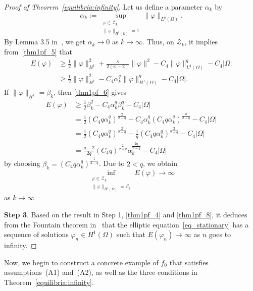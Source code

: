 \documentclass{elsarticle}
\begin{document}
\begin{proof}[Proof of Theorem~\ref{equilibria:infinity}]
Let us define a parameter $\alpha_k$ by
\[	
	\alpha_k:=\sup_{\substack{\varphi\in \mathcal{Z}_k \\ \|\varphi\|_{H^1(\Omega)}=1}}\|\varphi\|_{L^{q}(\Omega)}.
\]
By Lemma 3.5 in~\cite{Zhao2008}, we get $\alpha_k\rightarrow 0$ as $k\rightarrow\infty$. Thus, on $\mathcal{Z}_k$, it implies from~\eqref{thm1pf_5} that
\begin{equation}\label{thm1pf_6}
\begin{split}
	E(\varphi) &\geqslant \frac{1}{2} \|\varphi\|^2_{H^1} + \frac{\kappa}{2(\kappa-2)} \|\varphi\|^2 -C_4\|\varphi\|^{q}_{L^{q}(\Omega)} -C_4|\Omega|\\
	&\geqslant \frac{1}{2} \|\varphi\|^2_{H^1} - C_4 \alpha^q_k \|\varphi\|^{q}_{H^{1}(\Omega)} -C_4|\Omega|.
\end{split}
\end{equation}
If $\|\varphi\|_{H^1} =\beta_k$, then \eqref{thm1pf_6} gives
\begin{equation}\label{thm1pf_7}
\begin{split}
	E(\varphi) &\geqslant \frac{1}{2}\beta_k^2 - C_4 \alpha^q_k \beta_k^q -C_4|\Omega|\\
	&=\frac{1}{2}\left(C_4 q\alpha_k^q\right)^{\frac{2}{2-q}}- C_4 \alpha^q_k \left(C_4 q\alpha_k^q\right)^{\frac{q}{2-q}} -C_4|\Omega| \\
	&=\frac{1}{2}\left(C_4 q\alpha_k^q\right)^{\frac{2}{2-q}}- \frac{1}{q}\left(C_4 q\alpha_k^q\right)^{\frac{2}{2-q}} -C_4|\Omega|\\
	&=\frac{q-2}{2q}\left(C_4 q\right)^{\frac{2}{2-q}} \alpha_k^{\frac{2q}{2-q}}- C_4|\Omega|
\end{split}
\end{equation}
by choosing $\beta_k = \left(C_4 q\alpha_k^q\right)^{\frac{1}{2-q}}$. Due to $2<q$,  we obtain
\begin{equation}\label{thm1pf_8}
	\inf_{\substack{\varphi\in \mathcal{Z}_k \\ \|\varphi\|_{H^1(\Omega)} =\beta_k}}E(\varphi) \rightarrow \infty
\end{equation}
as $k\rightarrow\infty$

\textbf{Step 3}. Based on the result in Step 1, \eqref{thm1pf_4} and \eqref{thm1pf_8}, it deduces from the Fountain theorem in~\cite{willem2012minimax} that the elliptic equation~\eqref{eq_stationary} has a sequence of solutions $\varphi_n\in H^1(\Omega)$ such that $E(\varphi_n)\rightarrow\infty$ as $n$ goes to infinity.
\end{proof}

Now, we begin to construct a concrete example of $f_0$ that satisfies assumptions~(A1) and~(A2), as well as the three conditions in Theorem~\ref{equilibria:infinity}.
\end{document}
